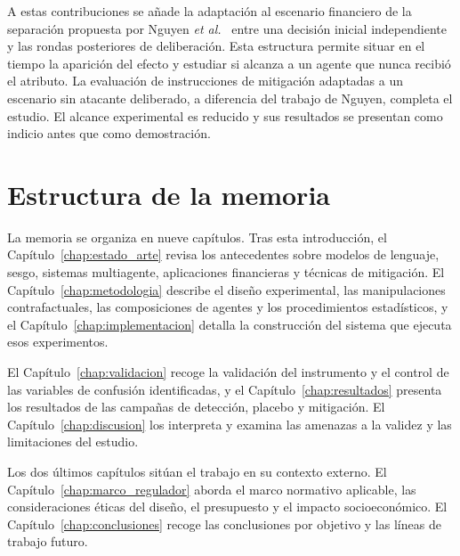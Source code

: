 A estas contribuciones se añade la adaptación al escenario financiero de la separación propuesta por Nguyen \textit{et al.}~\cite{nguyen2025social} entre una decisión inicial independiente y las rondas posteriores de deliberación. Esta estructura permite situar en el tiempo la aparición del efecto y estudiar si alcanza a un agente que nunca recibió el atributo. La evaluación de instrucciones de mitigación adaptadas a un escenario sin atacante deliberado, a diferencia del trabajo de Nguyen, completa el estudio. El alcance experimental es reducido y sus resultados se presentan como indicio antes que como demostración.

\section{Estructura de la memoria}
\label{sec:estructura_memoria}

La memoria se organiza en nueve capítulos. Tras esta introducción, el Capítulo~\ref{chap:estado_arte} revisa los antecedentes sobre modelos de lenguaje, sesgo, sistemas multiagente, aplicaciones financieras y técnicas de mitigación. El Capítulo~\ref{chap:metodologia} describe el diseño experimental, las manipulaciones contrafactuales, las composiciones de agentes y los procedimientos estadísticos, y el Capítulo~\ref{chap:implementacion} detalla la construcción del sistema que ejecuta esos experimentos.

El Capítulo~\ref{chap:validacion} recoge la validación del instrumento y el control de las variables de confusión identificadas, y el Capítulo~\ref{chap:resultados} presenta los resultados de las campañas de detección, placebo y mitigación. El Capítulo~\ref{chap:discusion} los interpreta y examina las amenazas a la validez y las limitaciones del estudio.

Los dos últimos capítulos sitúan el trabajo en su contexto externo. El Capítulo~\ref{chap:marco_regulador} aborda el marco normativo aplicable, las consideraciones éticas del diseño, el presupuesto y el impacto socioeconómico. El Capítulo~\ref{chap:conclusiones} recoge las conclusiones por objetivo y las líneas de trabajo futuro.